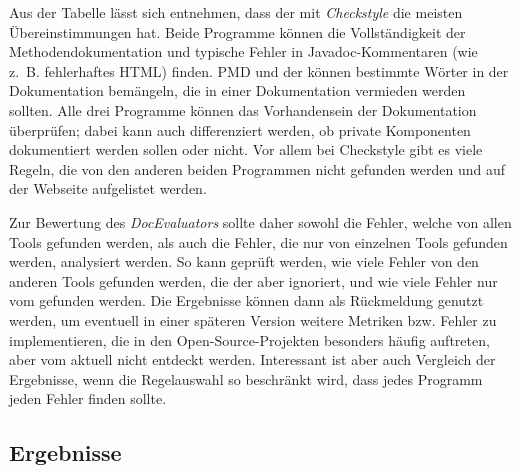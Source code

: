 Aus der Tabelle lässt sich entnehmen, dass der \doceval mit \textit{Checkstyle} die meisten Übereinstimmungen hat. Beide Programme können die Vollständigkeit der Methodendokumentation und typische Fehler in Javadoc-Kommentaren (wie z.~B. fehlerhaftes HTML) finden. PMD und der \doceval können bestimmte Wörter in der Dokumentation bemängeln, die in einer Dokumentation vermieden werden sollten. Alle drei Programme können das Vorhandensein der Dokumentation überprüfen; dabei kann auch differenziert werden, ob private Komponenten dokumentiert werden sollen oder nicht. Vor allem bei Checkstyle gibt es viele Regeln, die von den anderen beiden Programmen nicht gefunden werden und auf der Webseite \cite{checkstyle_doc_metrics} aufgelistet werden.

Zur Bewertung des \textit{DocEvaluators} sollte daher sowohl die Fehler, welche von allen Tools gefunden werden, als auch die Fehler, die nur von einzelnen Tools gefunden werden, analysiert werden. So kann  geprüft werden, wie viele Fehler von den anderen Tools gefunden werden, die der \doceval aber ignoriert, und wie viele Fehler nur vom \doceval gefunden werden. Die Ergebnisse können dann als Rückmeldung genutzt werden, um  eventuell in einer späteren Version weitere Metriken bzw. Fehler zu implementieren, die in den Open-Source-Projekten besonders häufig auftreten, aber vom \doceval aktuell nicht entdeckt werden. Interessant ist aber auch Vergleich der Ergebnisse, wenn die Regelauswahl so beschränkt wird, dass jedes Programm jeden Fehler finden sollte.

\subsection{Ergebnisse}


